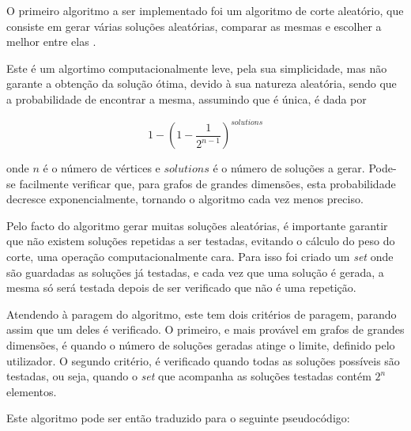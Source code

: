 \documentclass[mirror, portugues]{revdetua}
\begin{document}
O primeiro algoritmo a ser implementado foi um algoritmo de corte aleatório, que consiste em gerar várias soluções aleatórias, comparar as mesmas e escolher a melhor entre elas \cite{AG14}.

Este é um algortimo computacionalmente leve, pela sua simplicidade, mas não garante a obtenção da solução ótima, devido à sua natureza aleatória, sendo que a probabilidade de encontrar a mesma, assumindo que é única, é dada por

$$1 - \left( 1 - \frac{1}{2^{n-1}} \right)^{solutions}$$

\noindent onde $n$ é o número de vértices e $solutions$ é o número de soluções a gerar. Pode-se facilmente verificar que, para grafos de grandes dimensões, esta probabilidade decresce exponencialmente, tornando o algoritmo cada vez menos preciso.

Pelo facto do algoritmo gerar muitas soluções aleatórias, é importante garantir que não existem soluções repetidas a ser testadas, evitando o cálculo do peso do corte, uma operação computacionalmente cara. Para isso foi criado um \textit{set} onde são guardadas as soluções já testadas, e cada vez que uma solução é gerada, a mesma só será testada depois de ser verificado que não é uma repetição.

Atendendo à paragem do algoritmo, este tem dois critérios de paragem, parando assim que um deles é verificado. O primeiro, e mais provável em grafos de grandes dimensões, é quando o número de soluções geradas atinge o limite, definido pelo utilizador. O segundo critério, é verificado quando todas as soluções possíveis são testadas, ou seja, quando o \textit{set} que acompanha as soluções testadas contém $2^n$ elementos.

Este algoritmo pode ser então traduzido para o seguinte pseudocódigo:
\end{document}
